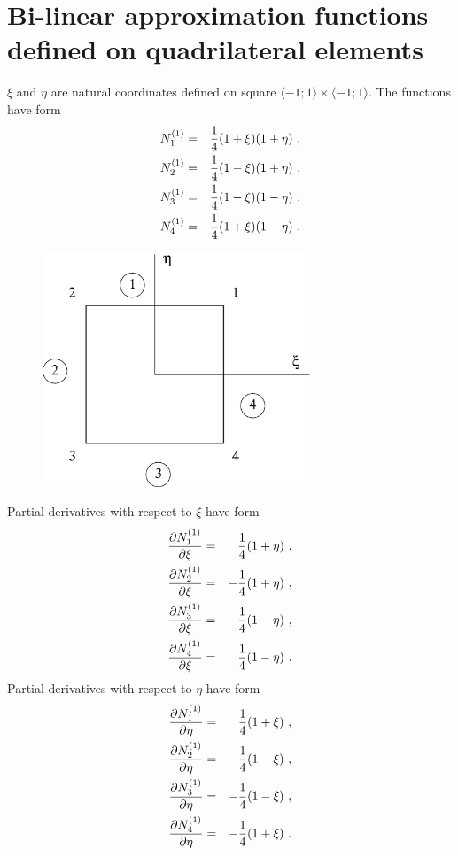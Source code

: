 \section{Bi-linear approximation functions defined on quadrilateral elements}
$\xi$ and $\eta$ are natural coordinates defined on square $\langle-1;1\rangle\times\langle-1;1\rangle$. The functions
have form
\begin{eqnarray}
\label{bflinquadn1}
N_1^{(1)} &=& \mbox{$\displaystyle\frac{1}{4}$} (1 + \xi) (1 + \eta)\ ,
\\
\label{bflinquadn2}
N_2^{(1)} &=& \mbox{$\displaystyle\frac{1}{4}$} (1 - \xi) (1 + \eta)\ ,
\\
\label{bflinquadn3}
N_3^{(1)} &=& \mbox{$\displaystyle\frac{1}{4}$} (1 - \xi) (1 - \eta)\ ,
\\
\label{bflinquadn4}
N_4^{(1)} &=& \mbox{$\displaystyle\frac{1}{4}$} (1 + \xi) (1 - \eta)\ .
\end{eqnarray}
\begin{figure}
\begin{center}
\includegraphics[width=80mm]{FIG/linquad.eps}
\end{center}
\end{figure}
Partial derivatives with respect to $\xi$ have form
\begin{eqnarray}
\label{bflinquaddx1}
\mbox{$\displaystyle\frac{\partial{N_1^{(1)}}}{\partial{\xi}}$} &=& \mbox{$\displaystyle\frac{1}{4}$} (1 + \eta)\ ,
\\
\label{bflinquaddx2}
\mbox{$\displaystyle\frac{\partial{N_2^{(1)}}}{\partial{\xi}}$} &=& - \mbox{$\displaystyle\frac{1}{4}$} (1 + \eta)\ ,
\\
\label{bflinquaddx3}
\mbox{$\displaystyle\frac{\partial{N_3^{(1)}}}{\partial{\xi}}$} &=& - \mbox{$\displaystyle\frac{1}{4}$} (1 - \eta)\ ,
\\
\label{bflinquaddx4}
\mbox{$\displaystyle\frac{\partial{N_4^{(1)}}}{\partial{\xi}}$} &=& \mbox{$\displaystyle\frac{1}{4}$} (1 - \eta)\ .
\end{eqnarray}
Partial derivatives with respect to $\eta$ have form
\begin{eqnarray}
\label{bflinquaddy1}
\mbox{$\displaystyle\frac{\partial{N_1^{(1)}}}{\partial{\eta}}$} &=& \mbox{$\displaystyle\frac{1}{4}$} (1 + \xi)\ ,
\\
\label{bflinquaddy2}
\mbox{$\displaystyle\frac{\partial{N_2^{(1)}}}{\partial{\eta}}$} &=& \mbox{$\displaystyle\frac{1}{4}$} (1 - \xi)\ ,
\\
\label{bflinquaddy3}
\mbox{$\displaystyle\frac{\partial{N_3^{(1)}}}{\partial{\eta}}$} &=& - \mbox{$\displaystyle\frac{1}{4}$} (1 - \xi)\ ,
\\
\label{bflinquaddy4}
\mbox{$\displaystyle\frac{\partial{N_4^{(1)}}}{\partial{\eta}}$} &=& - \mbox{$\displaystyle\frac{1}{4}$} (1 + \xi)\ .
\end{eqnarray}


